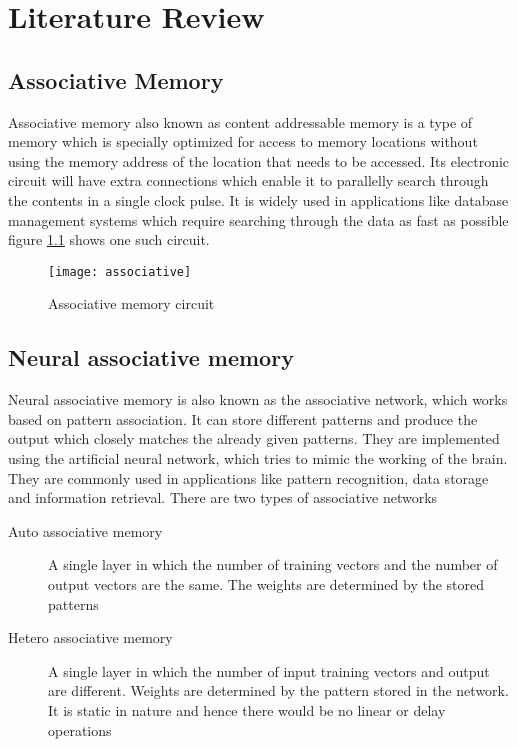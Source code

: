\chapter{Literature Review}
\section{Associative Memory}
Associative memory also known as content addressable memory is a type of memory
which is specially optimized for access to memory locations without using the
memory address of the location that needs to be accessed. Its electronic
circuit will have extra connections which enable it to parallelly search
through the contents in a single clock pulse. It is widely used in applications
like database management systems which require searching through the data as
fast as possible figure \ref{associative_circuit} shows one such circuit.
\begin{figure}[h!]
    \centering
    \texttt{[image: associative]}
    \caption{Associative memory circuit}
    \label{associative_circuit}
\end{figure}
\section{Neural associative memory}
Neural associative memory is also known as the associative network, which works
based on pattern association. It can store different patterns and produce the
output which closely matches the already given patterns. They are implemented
using the artificial neural network, which tries to mimic the working of the
brain. They are commonly used in applications like pattern recognition, data
storage and information retrieval. There are two types of associative networks
\begin{description}
    \item[Auto associative memory]A single layer \nn in which the number of training
    vectors and the number of output vectors are the same. The weights are
    determined by the stored patterns
    \item[Hetero associative memory]A single layer \nn in which the number of input
    training vectors and output are different. Weights are determined by the
    pattern stored in the network. It is static in nature and hence there would be
    no linear or delay operations
\end{description}

